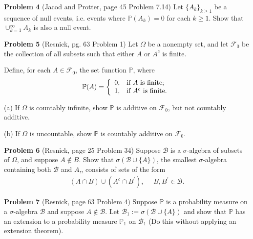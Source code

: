 \documentclass{article}
\begin{document}
\vspace{2 mm}

\noindent \textbf{Problem 4} (Jacod and Protter, page 45 Problem 7.14) Let $\{A_{k}\}_{k \geq 1}$ be a sequence of null events, i.e. events where $\mathbb{P}(A_{k}) = 0$ for each $k \geq 1$.  Show that $\cup_{k=1}^{\infty}A_{k}$ is also a null event.

\vspace{2 mm}

\noindent \textbf{Problem 5} (Resnick, pg. 63 Problem 1) Let $\Omega$ be a nonempty set, and let $\mathcal{F}_{0}$ be the collection of all subsets such that either $A$ or $A^{c}$ is finite.

\vspace{2 mm}

\noindent Define, for each $A \in \mathcal{F}_{0}$, the set function $\mathbb{P}$, where
\begin{eqnarray*} \mathbb{P}(A) = \left\{
                                    \begin{array}{ll}
                                      0, & \hbox{if $A$ is finite;} \\
                                      1, & \hbox{if $A^{c}$ is finite.}
                                    \end{array}
                                  \right. \end{eqnarray*}

\vspace{2 mm}

\noindent (a) If $\Omega$ is countably infinite, show $\mathbb{P}$ is additive on $\mathcal{F}_{0}$, but not countably additive.

\vspace{2 mm}

\noindent (b) If $\Omega$ is uncountable, show $\mathbb{P}$ is countably additive on $\mathcal{F}_{0}$.

\vspace{2 mm}

\noindent \textbf{Problem 6} (Resnick, page 25 Problem 34) Suppose $\mathcal{B}$ is a $\sigma$-algebra of subsets of $\Omega$, and suppose $A \notin B$.  Show that $\sigma(\mathcal{B} \cup \{A\})$, the smallest $\sigma$-algebra containing both $\mathcal{B}$ and $A$,, consists of sets of the form
\begin{eqnarray*} (A \cap B) \cup (A^{c} \cap B^{'}), ~~~~~~ B, B^{'} \in \mathcal{B}. \end{eqnarray*}

\vspace{2 mm}

\noindent \textbf{Problem 7} (Resnick, page 63 Problem 4) Suppose $\mathbb{P}$ is a probability measure on a $\sigma$-algebra $\mathcal{B}$ and suppose $A \notin \mathcal{B}$.  Let $\mathcal{B}_{1} := \sigma(\mathcal{B} \cup \{A\})$ and show that $\mathbb{P}$ has an extension to a probability measure $\mathbb{P}_{1}$ on $\mathcal{B}_{1}$ (Do this without applying an extension theorem).
\end{document}
